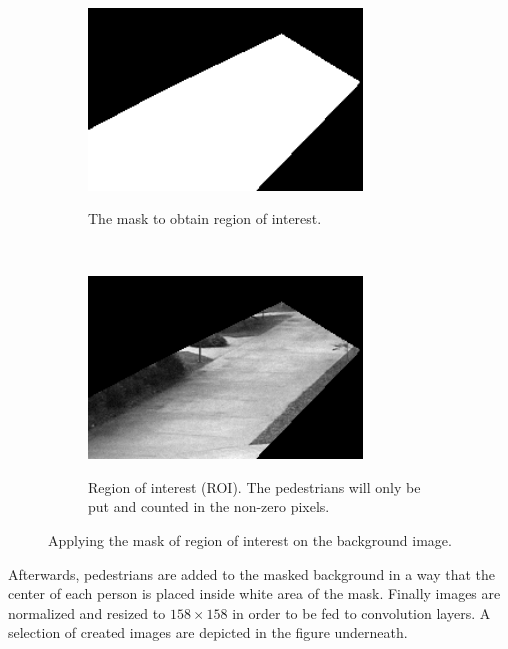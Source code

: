 \begin{enumerate}
\begin{figure}[h!]
    \centering
    \begin{subfigure}[t]{0.5\textwidth}
        \centering
        {\includegraphics[width=0.8\textwidth]{images/catwalk}}
        \caption{The mask to obtain region of interest.}
    \end{subfigure}%
    ~ 
    \begin{subfigure}[t]{0.5\textwidth}
        \centering
        {\includegraphics[width=0.8\textwidth]{images/roi}}
        \caption{Region of interest (ROI). The pedestrians will only be put and counted in the non-zero pixels.}
    \end{subfigure}
    \caption{Applying the mask of region of interest on the background image.}
    \label{fig:roi}
\end{figure}

Afterwards, pedestrians are added to the masked background in a way that the center of each person is placed inside white area of the mask. Finally images are normalized and resized to $158\times158$ in order to be fed to convolution layers. A selection of created images are depicted in the figure underneath.


\end{enumerate}
